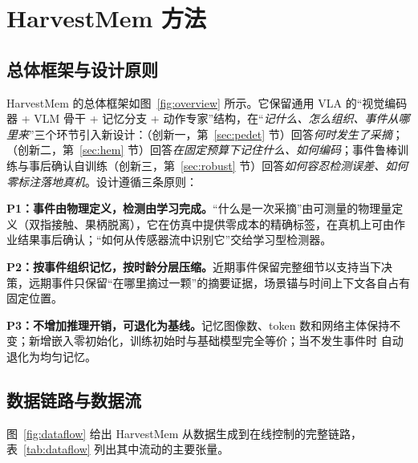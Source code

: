 \section{HarvestMem 方法}
\label{sec:method}

\subsection{总体框架与设计原则}
\label{sec:framework}
HarvestMem 的总体框架如图~\ref{fig:overview} 所示。它保留通用 VLA 的“视觉编码器 + VLM 骨干 + 记忆分支 + 动作专家”结构，在“\emph{记什么、怎么组织、事件从哪里来}”三个环节引入新设计：\pedet{}（创新一，第~\ref{sec:pedet} 节）回答\emph{何时发生了采摘}；\hem{}（创新二，第~\ref{sec:hem} 节）回答\emph{在固定预算下记住什么、如何编码}；事件鲁棒训练与事后确认自训练（创新三，第~\ref{sec:robust} 节）回答\emph{如何容忍检测误差、如何零标注落地真机}。设计遵循三条原则：

\textbf{P1：事件由物理定义，检测由学习完成。}“什么是一次采摘”由可测量的物理量定义（双指接触、果柄脱离），它在仿真中提供零成本的精确标签，在真机上可由作业结果事后确认；“如何从传感器流中识别它”交给学习型检测器。

\textbf{P2：按事件组织记忆，按时龄分层压缩。}近期事件保留完整细节以支持当下决策，远期事件只保留“在哪里摘过一颗”的摘要证据，场景锚与时间上下文各自占有固定位置。

\textbf{P3：不增加推理开销，可退化为基线。}记忆图像数、token 数和网络主体保持不变；新增嵌入零初始化，训练初始时与基础模型完全等价；当不发生事件时 \hem{} 自动退化为均匀记忆。

\subsection{数据链路与数据流}
\label{sec:dataflow}
图~\ref{fig:dataflow} 给出 HarvestMem 从数据生成到在线控制的完整链路，表~\ref{tab:dataflow} 列出其中流动的主要张量。

